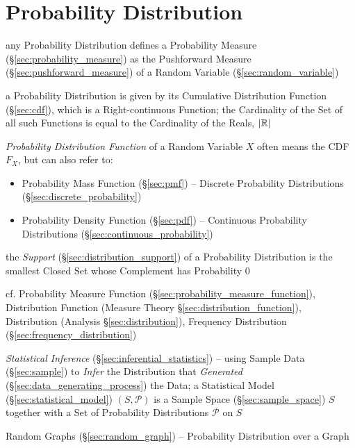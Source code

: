 \section{Probability Distribution}\label{sec:probability_distribution}

any Probability Distribution defines a Probability Measure
(\S\ref{sec:probability_measure}) as the Pushforward Measure
(\S\ref{sec:pushforward_measure}) of a Random Variable
(\S\ref{sec:random_variable})

a Probability Distribution is given by its Cumulative Distribution Function
(\S\ref{sec:cdf}), which is a Right-continuous Function; the Cardinality of the
Set of all such Functions is equal to the Cardinality of the Reals, $|\mathbb{R}|$

\emph{Probability Distribution Function} of a Random Variable $X$ often means
the CDF $F_X$, but can also refer
to:
\begin{itemize}
  \item Probability Mass Function (\S\ref{sec:pmf}) -- Discrete Probability
    Distributions (\S\ref{sec:discrete_probability})
  \item Probability Density Function (\S\ref{sec:pdf}) -- Continuous Probability
    Distributions (\S\ref{sec:continuous_probability})
\end{itemize}

the \emph{Support} (\S\ref{sec:distribution_support}) of a Probability
Distribution is the smallest Closed Set whose Complement has Probability $0$

\fist cf. Probability Measure Function
(\S\ref{sec:probability_measure_function}), Distribution Function (Measure
Theory \S\ref{sec:distribution_function}), Distribution (Analysis
\S\ref{sec:distribution}), Frequency Distribution
(\S\ref{sec:frequency_distribution})

\fist \emph{Statistical Inference} (\S\ref{sec:inferential_statistics}) -- using
Sample Data (\S\ref{sec:sample}) to \emph{Infer} the Distribution that
\emph{Generated} (\S\ref{sec:data_generating_process}) the Data; a Statistical
Model (\S\ref{sec:statistical_model}) $(S,\mathcal{P})$ is a Sample Space
(\S\ref{sec:sample_space}) $S$ together with a Set of Probability Distributions
$\mathcal{P}$ on $S$

\fist Random Graphs (\S\ref{sec:random_graph}) -- Probability Distribution over
a Graph

